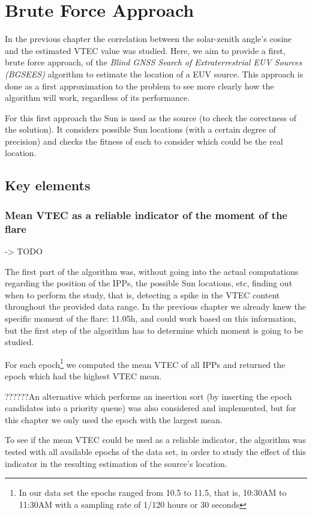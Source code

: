 \chapter{Brute Force Approach}

In the previous chapter the correlation between the solar-zenith angle's cosine and the estimated VTEC value was studied. Here, we aim to provide a first, brute force approach, of the \textit{Blind GNSS Search of Extraterrestrial EUV Sources (BGSEES)} algorithm to estimate the location of a EUV source. This approach is done as a first approximation to the problem to see more clearly how the algorithm will work, regardless of its performance.

For this first approach the Sun is used as the source (to check the corectness of the solution). It considers possible Sun locations (with a certain degree of precision) and checks the fitness of each to consider which could be the real location.

\section{Key elements}

\subsection{Mean VTEC as a reliable indicator of the moment of the flare} -> TODO

The first part of the algorithm was, without going into the actual computations regarding the position of the IPPs, the possible Sun locations, etc, finding out when to perform the study, that is, detecting a spike in the VTEC content throughout the provided data range. 
In the previous chapter we already knew the specific moment of the flare: 11.05h, and could work based on this information, but the first step of the algorithm has to determine which moment is going to be studied.

For each epoch\footnote{In our data set the epochs ranged from 10.5 to 11.5, that is, 10:30AM to 11:30AM with a sampling rate of 1/120 hours or 30 seconds} we computed the mean VTEC of all IPPs and returned the epoch which had the highest VTEC mean.

??????An alternative which performs an insertion sort (by inserting the epoch candidates into a priority queue) was also considered and implemented, but for this chapter we only used the epoch with the largest mean.

To see if the mean VTEC could be used as a reliable indicator, the algorithm was tested with all available epochs of the data set, in order to study the effect of this indicator in the resulting estimation of the source's location.

